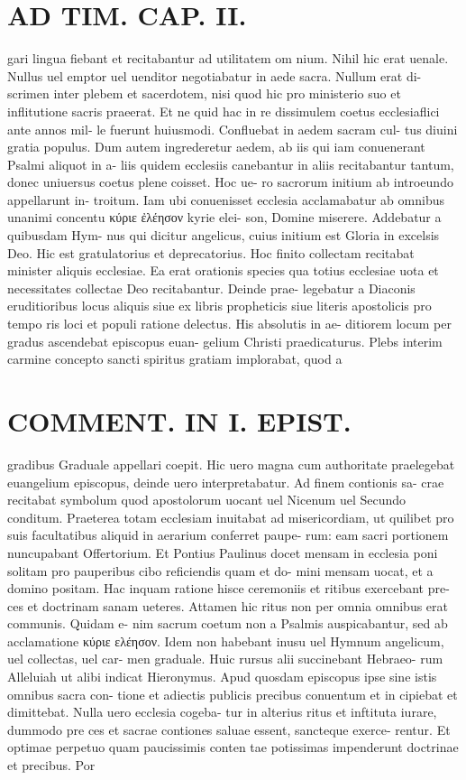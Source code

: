 \documentclass{article}
\begin{document}
\begin{pages}
\section*{AD TIM. CAP. II. }
\marginpar{[ p.109 ]}\pstart gari lingua fiebant et recitabantur ad utilitatem om nium. Nihil hic erat uenale. Nullus uel emptor uel uenditor negotiabatur in aede sacra. Nullum erat di- scrimen inter plebem et sacerdotem, nisi quod hic pro ministerio suo et inflitutione sacris praeerat. Et ne quid hac in re dissimulem coetus ecclesiaflici ante annos mil- le fuerunt huiusmodi. Confluebat in aedem sacram cul- tus diuini gratia populus. Dum autem ingrederetur aedem, ab iis qui iam conuenerant Psalmi aliquot in a- liis quidem ecclesiis canebantur in aliis recitabantur tantum, donec uniuersus coetus plene coisset. Hoc ue- ro sacrorum initium ab introeundo appellarunt in- troitum. Iam ubi conuenisset ecclesia acclamabatur ab omnibus unanimi concentu κύριε ἐλέησον kyrie elei- son, Domine miserere. Addebatur a quibusdam Hym- nus qui dicitur angelicus, cuius initium est Gloria in excelsis Deo. Hic est gratulatorius et deprecatorius. Hoc finito collectam recitabat minister aliquis ecclesiae. Ea erat orationis species qua totius ecclesiae uota et necessitates collectae Deo recitabantur. Deinde prae- legebatur a Diaconis eruditioribus locus aliquis siue ex libris propheticis siue literis apostolicis pro tempo ris loci et populi ratione delectus. His absolutis in ae- ditiorem locum per gradus ascendebat episcopus euan- gelium Christi praedicaturus. Plebs interim carmine concepto sancti spiritus gratiam implorabat, quod a  \pend
\section*{COMMENT. IN I. EPIST. }\pstart gradibus Graduale appellari coepit. Hic uero magna cum authoritate praelegebat euangelium episcopus, deinde uero interpretabatur. Ad finem contionis sa- crae recitabat symbolum quod apostolorum uocant uel Nicenum uel Secundo conditum. Praeterea totam ecclesiam inuitabat ad misericordiam, ut quilibet pro suis facultatibus aliquid in aerarium conferret paupe- rum: eam sacri portionem nuncupabant Offertorium. Et Pontius Paulinus docet mensam in ecclesia poni solitam pro pauperibus cibo reficiendis quam et do- mini mensam uocat, et a domino positam. Hac inquam ratione hisce ceremoniis et ritibus exercebant pre- ces et doctrinam sanam ueteres. Attamen hic ritus non per omnia omnibus erat communis. Quidam e- nim sacrum coetum non a Psalmis auspicabantur, sed ab acclamatione κύριε ελέησον. Idem non habebant inusu uel Hymnum angelicum, uel collectas, uel car- men graduale. Huic rursus alii succinebant Hebraeo- rum Alleluiah ut alibi indicat Hieronymus. Apud quosdam episcopus ipse sine istis omnibus sacra con- tione et adiectis publicis precibus conuentum et in cipiebat et dimittebat. Nulla uero ecclesia cogeba- tur in alterius ritus et inftituta iurare, dummodo pre ces et sacrae contiones saluae essent, sancteque exerce- rentur. Et optimae perpetuo quam paucissimis conten tae potissimas impenderunt doctrinae et precibus. Por  \pend

\end{pages}
\end{document}
